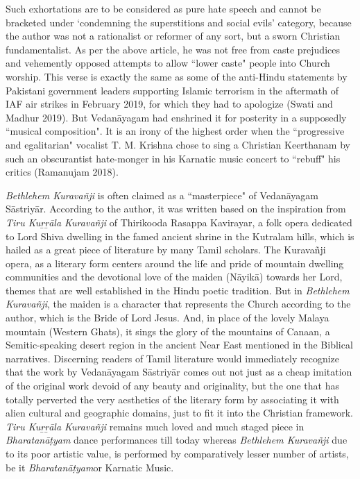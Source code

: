 Such exhortations are to be considered as pure hate speech and cannot be bracketed under `condemning the superstitions and social evils' category, because the author was not a rationalist or reformer of any sort, but a sworn Christian fundamentalist. As per the above article, he was not free from caste prejudices and vehemently opposed attempts to allow ``lower caste" people into Church worship. This verse is exactly the same as some of the anti-Hindu statements by Pakistani government leaders supporting Islamic terrorism in the aftermath of IAF air strikes in February 2019, for which they had to apologize (Swati and Madhur 2019). But Vedanāyagam had enshrined it for posterity in a supposedly ``musical composition". It is an irony of the highest order when the ``progressive and egalitarian" vocalist T. M. Krishna chose to sing a Christian Keerthanam by such an obscurantist hate-monger in his Karnatic music concert to ``rebuff" his critics (Ramanujam 2018).

\textit{Bethlehem Kuravañji} is often claimed as a ``masterpiece" of Vedanāya\-gam Sāstriyār. According to the author, it was written based on the inspiration from \textit{Tiru Kuṟṟāla Kuravañji} of Thirikooda Rasappa Kavirayar, a folk opera dedicated to Lord Shiva dwelling in the famed ancient shrine in the Kutralam hills, which is hailed as a great piece of literature by many Tamil scholars. The Kuravañji opera, as a literary form centers around the life and pride of mountain dwelling communities and the devotional love of the maiden (Nāyikā) towards her Lord, themes that are well established in the Hindu poetic tradition. But in \textit{Bethlehem Kuravañji}, the maiden is a character that represents the Church according to the author, which is the Bride of Lord Jesus. And, in place of the lovely Malaya mountain (Western Ghats), it sings the glory of the mountains of Canaan, a Semitic-speaking desert region in the ancient Near East mentioned in the Biblical narratives. Discerning readers of Tamil literature would immediately recognize that the work by Vedanāyagam Sāstriyār comes out not just as a cheap imitation of the original work devoid of any beauty and originality, but the one that has totally perverted the very aesthetics of the literary form by associating it with alien cultural and geographic domains, just to fit it into the Christian framework. \textit{Tiru Kuṟṟāla Kuravañji }remains much loved and much staged piece in \textit{Bharatanāṭ­yam} dance performances till today whereas \textit{Bethlehem Kuravañji} due to its poor artistic value, is performed by comparatively lesser number of artists, be it \textit{Bharatanāṭ­yam}or Karnatic Music.

